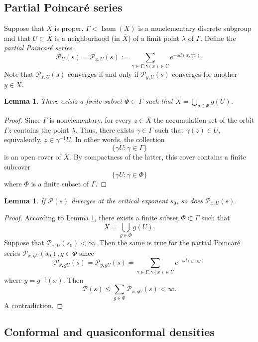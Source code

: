 \documentclass[12pt]{amsbook}%
\newtheorem{lem}[thm]{Lemma}
\theoremstyle{definition}
\theoremstyle{remark}
\numberwithin{section}{chapter}
\numberwithin{subsection}{section}
\numberwithin{figure}{chapter}
\DeclareMathOperator{\Isom}{Isom}
\def\cP{{\mathscr{P}}}
\def\Ga{\Gamma}
\def\ga{\gamma}
\def\la{\lambda}
\def\ol{\overline}
\begin{document}
{{\subsection{Partial Poincar\'e series} 

 Suppose that $X$ is proper, $\Ga< \Isom(X)$ is a nonelementary discrete subgroup and that $U\subset \ol{X}$ is  a neighborhood 
 (in $\ol{X}$) of a limit point $\la$ of $\Ga$. Define the {\em partial Poincar\'e series} 
\begin{equation}\label{eq:pps}
\cP_{U}(s)=\cP_{x,U}(s):= \sum_{\ga\in \Ga, \ga(x)\in U} e^{-sd(x, \ga x)}. 
\end{equation}
Note that $\cP_{x,U}(s)$ converges if and only if $\cP_{y,U}(s)$ converges for another $y\in X$. 

\begin{lem}\label{lem:cover}
There exists a finite subset $\Phi\subset \Ga$ such that $\ol{X}= \bigcup_{g\in \Phi} g(U)$. 
\end{lem}
\begin{proof}
Since $\Ga$ is nonelementary, for every $z\in \ol{X}$ the accumulation set of the orbit $\Ga z$ contains the point $\la$. Thus, there exists $\ga\in \Ga$ such that $\ga(z)\in U$, equivalently, $z\in \ga^{-1}U$. In other words, the collection
$$
\{\ga U: \ga\in \Ga\}
$$
is an open cover of $\ol{X}$. By compactness of the latter, this cover contains a finite subcover 
$$
\{\ga U: \ga\in \Phi\}
$$
where $\Phi$ is a finite subset of $\Ga$. \end{proof}

\begin{lem}\label{lem:partialPS}
If $\cP(s)$ diverges at the critical exponent $s_0$, so does $\cP_{x,U}(s)$. 
\end{lem}
\begin{proof} According to Lemma \ref{lem:cover}, there exists a finite subset $\Phi\subset \Ga$ such that
$$\ol{X}= \bigcup_{g\in \Phi} g(U). $$
Suppose that $\cP_{x,U}(s_0)<\infty$. Then the same is true for the partial Poincar\'e series $\cP_{x,gU}(s_0), g\in \Phi$ since 
$$\cP_{x,gU}(s)= \cP_{y, gU}(s)= \sum_{\ga\in \Ga, \ga(x)\in U} e^{-sd(y, \ga y)}$$
where $y=g^{-1}(x)$. Then  
$$\cP(s)\leqslant  \sum_{g\in \Phi} \cP_{x,gU}(s)<\infty. $$
A contradiction. \end{proof} 


\subsection{Conformal and quasiconformal densities}

}}
\end{document}
